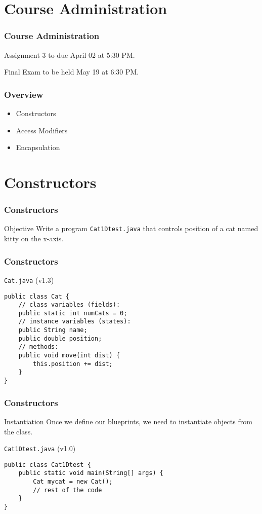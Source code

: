 \documentclass[10pt, compress]{beamer}
\begin{document}
\prepareCover

\section{Course Administration}

\begin{frame}[fragile]
\frametitle{Course Administration}
Assignment 3 to due April 02 at 5:30 PM.

Final Exam to be held May 19 at 6:30 PM.
\end{frame}

\begin{frame}[fragile]
	\frametitle{Overview}
	\begin{itemize}
		\item[] Constructors
		\item[] Access Modifiers
		\item[] Encapsulation
	\end{itemize}
\end{frame}

\section{Constructors}

\begin{frame}[fragile]
	\frametitle{Constructors}
	\begin{block}{Objective}
		Write a program \texttt{Cat1Dtest.java} that controls position of a cat named kitty on the x-axis.
	\end{block}
\end{frame}

\begin{frame}[fragile]
	\frametitle{Constructors}
	\begin{block}{\texttt{Cat.java} (v1.3)}
		\begin{verbatim}
public class Cat {
	// class variables (fields):
	public static int numCats = 0;
	// instance variables (states):
	public String name;
	public double position;
	// methods:
	public void move(int dist) {
		this.position += dist;
	}
}
		\end{verbatim}
	\end{block}
\end{frame}

\begin{frame}[fragile]
	\frametitle{Constructors}
	\begin{block}{Instantiation}
	Once we define our blueprints, we need to instantiate objects from the class.
	\end{block}
	\begin{block}{\texttt{Cat1Dtest.java} (v1.0)}
		\begin{verbatim}
public class Cat1Dtest {
	public static void main(String[] args) {
		Cat mycat = new Cat();
		// rest of the code
	}
}
		\end{verbatim}
	\end{block}
\end{frame}
\end{document}
